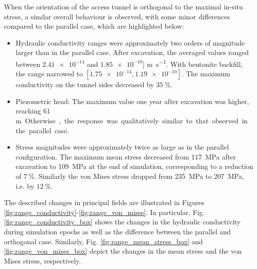 When the orientation of the access tunnel is orthogonal to the maximal in-situ stress, a similar overall behaviour is observed, with some minor differences compared to the parallel case, which are highlighted below:
\begin{itemize}
\item Hydraulic conductivity ranges were approximately two orders of magnitude larger than in the parallel case. After excavation, the averaged values ranged between $\num{2.41e-14}$ and $\num{1.85e-10}]$ \unit{\meter\per\second}. 
With bentonite backfill, the range narrowed to $[\num{1.75e-14}, \num{1.19e-10}]$.
The maximum conductivity on the tunnel sides decreased by $35~\%$.

\item Piezometric head: The maximum value one year after excavation was higher, reaching $61$ \unit\meter. Otherwise, the response was qualitatively similar to that observed in the parallel case.


\item Stress magnitudes were approximately twice as large as in the parallel configuration. The maximum mean stress decreased from \SI{117}{\MPa} after excavation to \SI{109}{\MPa} at the end of simulation, corresponding to a reduction of $7~\%$.
Similarly the von Mises stress dropped from \SI{235}{\MPa} to \SI{207}{\MPa}, i.e. by $12~\%$.
\end{itemize}

The described changes in principal fields are illustrated in Figures \ref{fig:range_conductivity}-\ref{fig:range_von_mises}.
In particular, Fig. \ref{fig:range_conductivity_box} shows the changes in the hydraulic conductivity during simulation epochs as well as the difference between the parallel and orthogonal case.
Similarly, Fig. \ref{fig:range_mean_stress_box} and \ref{fig:range_von_mises_box} depict the changes in the mean stress and the von Mises stress, respectively.

